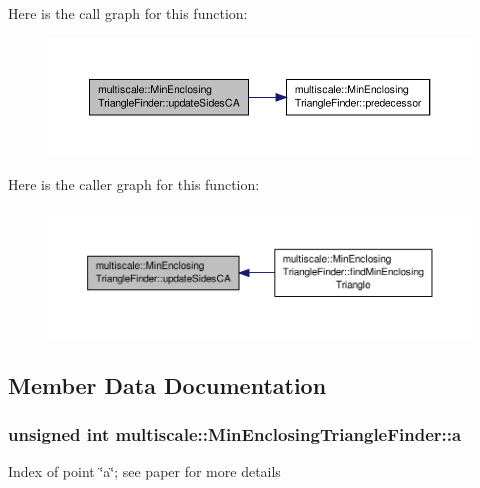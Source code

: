Here is the call graph for this function\-:\nopagebreak
\begin{figure}[H]
\begin{center}
\leavevmode
\includegraphics[width=350pt]{classmultiscale_1_1MinEnclosingTriangleFinder_a0f4a9131f5118fa0afc33344bdf67f16_cgraph}
\end{center}
\end{figure}




Here is the caller graph for this function\-:\nopagebreak
\begin{figure}[H]
\begin{center}
\leavevmode
\includegraphics[width=350pt]{classmultiscale_1_1MinEnclosingTriangleFinder_a0f4a9131f5118fa0afc33344bdf67f16_icgraph}
\end{center}
\end{figure}




\subsection{Member Data Documentation}
\hypertarget{classmultiscale_1_1MinEnclosingTriangleFinder_acb13371219bdd9b7c57131f1535e4c89}{
\subsubsection[{a}]{\setlength{\rightskip}{0pt plus 5cm}unsigned int multiscale\-::\-Min\-Enclosing\-Triangle\-Finder\-::a\hspace{0.3cm}{\ttfamily [private]}}}\label{classmultiscale_1_1MinEnclosingTriangleFinder_acb13371219bdd9b7c57131f1535e4c89}
Index of point \char`\"{}a\char`\"{}; see paper for more details 

